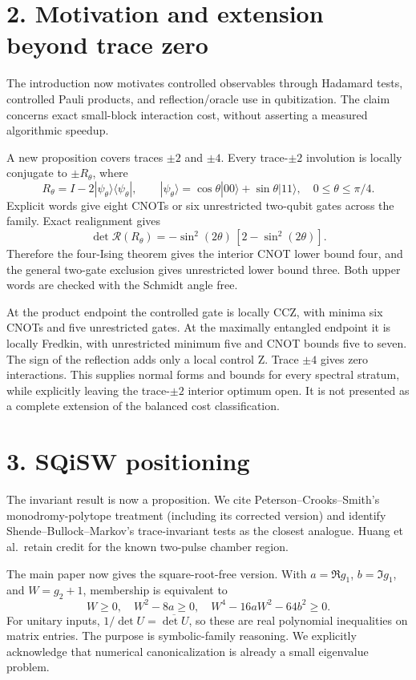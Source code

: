 \documentclass[11pt]{article}
\begin{document}
\section*{2. Motivation and extension beyond trace zero}
The introduction now motivates controlled observables through Hadamard tests,
controlled Pauli products, and reflection/oracle use in qubitization. The
claim concerns exact small-block interaction cost, without asserting a
measured algorithmic speedup.

A new proposition covers traces $\pm2$ and $\pm4$. Every trace-$\pm2$
involution is locally conjugate to $\pm R_\theta$, where
\[
 R_\theta=I-2|\psi_\theta\rangle\langle\psi_\theta|,\qquad
 |\psi_\theta\rangle=\cos\theta|00\rangle+\sin\theta|11\rangle,
 \quad0\le\theta\le\pi/4.
\]
Explicit words give eight CNOTs or six unrestricted two-qubit gates across
the family. Exact realignment gives
\[
 \det\mathcal R(R_\theta)=-\sin^2(2\theta)\,[2-\sin^2(2\theta)].
\]
Therefore the four-Ising theorem gives the interior CNOT lower bound four,
and the general two-gate exclusion gives unrestricted lower bound three.
Both upper words are checked with the Schmidt angle free.

At the product endpoint the controlled gate is locally CCZ, with minima
six CNOTs and five unrestricted gates. At the maximally entangled endpoint
it is locally Fredkin, with unrestricted minimum five and CNOT bounds
five to seven. The sign of the reflection adds only a local control Z.
Trace $\pm4$ gives zero interactions. This supplies normal forms and bounds
for every spectral stratum, while explicitly leaving the trace-$\pm2$
interior optimum open. It is not presented as a complete extension of the
balanced cost classification.

\section*{3. SQiSW positioning}
The invariant result is now a proposition. We cite Peterson--Crooks--Smith's
monodromy-polytope treatment (including its corrected version) and identify
Shende--Bullock--Markov's trace-invariant tests as the closest analogue.
Huang et al.\ retain credit for the known two-pulse chamber region.

The main paper now gives the square-root-free version. With
$a=\Re g_1$, $b=\Im g_1$, and $W=g_2+1$, membership is equivalent to
\[
 W\ge0,\quad W^2-8a\ge0,\quad W^4-16aW^2-64b^2\ge0.
\]
For unitary inputs, $1/\det U=\overline{\det U}$, so these are real
polynomial inequalities on matrix entries. The purpose is symbolic-family
reasoning. We explicitly acknowledge that numerical canonicalization is
already a small eigenvalue problem.
\end{document}

